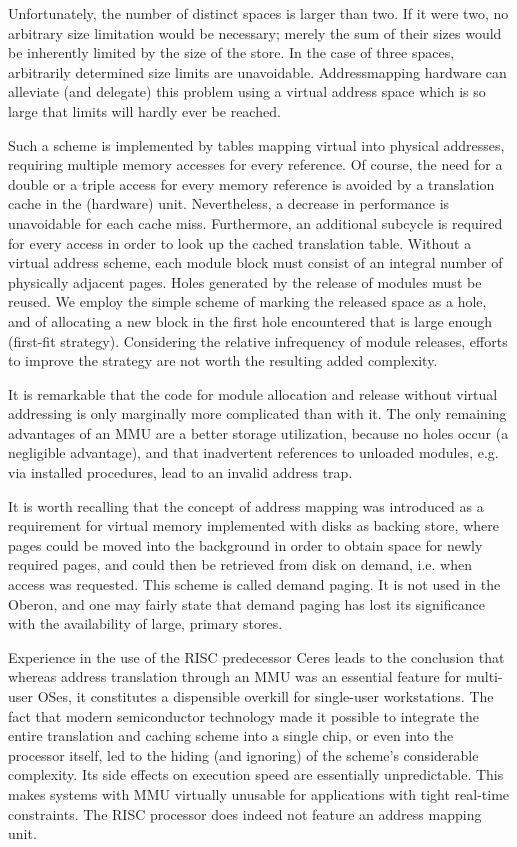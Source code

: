 Unfortunately, the number of distinct spaces is larger than two. If it were two, no arbitrary size
limitation would be necessary; merely the sum of their sizes would be inherently limited by the size
of the store. In the case of three spaces, arbitrarily determined size limits are unavoidable. Addressmapping hardware can alleviate (and delegate) this problem using a virtual address space which is
so large that limits will hardly ever be reached.

Such a scheme is implemented by tables mapping virtual into physical addresses, requiring multiple
memory accesses for every reference. Of course, the need for a double or a triple access for every
memory reference is avoided by a translation cache in the (hardware) unit. Nevertheless, a
decrease in performance is unavoidable for each cache miss. Furthermore, an additional subcycle
is required for every access in order to look up the cached translation table. Without a virtual
address scheme, each module block must consist of an integral number of physically adjacent
pages. Holes generated by the release of modules must be reused. We employ the simple scheme
of marking the released space as a hole, and of allocating a new block in the first hole encountered
that is large enough (first-fit strategy). Considering the relative infrequency of module releases,
efforts to improve the strategy are not worth the resulting added complexity.

It is remarkable that the code for module allocation and release without virtual addressing is only
marginally more complicated than with it. The only remaining advantages of an MMU are a better
storage utilization, because no holes occur (a negligible advantage), and that inadvertent
references to unloaded modules, e.g. via installed procedures, lead to an invalid address trap.

It is worth recalling that the concept of address mapping was introduced as a requirement for virtual
memory implemented with disks as backing store, where pages could be moved into the
background in order to obtain space for newly required pages, and could then be retrieved from
disk on demand, i.e. when access was requested. This scheme is called demand paging. It is not
used in the Oberon, and one may fairly state that demand paging has lost its significance
with the availability of large, primary stores.

Experience in the use of the RISC predecessor Ceres leads to the conclusion that whereas address
translation through an MMU was an essential feature for multi-user OSes, it constitutes
a dispensible overkill for single-user workstations. The fact that modern semiconductor technology
made it possible to integrate the entire translation and caching scheme into a single chip, or even
into the processor itself, led to the hiding (and ignoring) of the scheme's considerable complexity.
Its side effects on execution speed are essentially unpredictable. This makes systems with MMU
virtually unusable for applications with tight real-time constraints. The RISC processor does indeed
not feature an address mapping unit.

